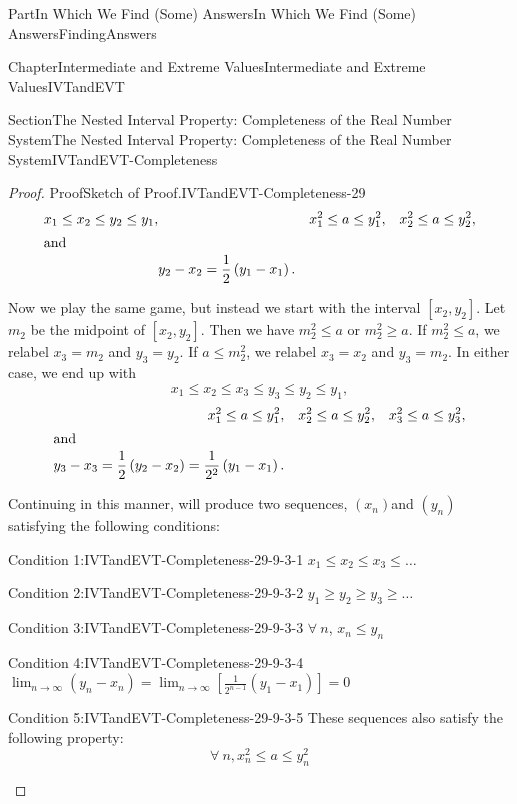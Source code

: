 \documentclass[oneside,10pt,]{book}
\numberwithin{equation}{part}
\def\limit#1#2#3{{\displaystyle\lim_{#1\rightarrow #2}#3}}
\newcommand{\amp}{&}
\begin{document}
\begin{partptx}{Part}{In Which We Find (Some) Answers}{}{In Which We Find (Some) Answers}{}{}{FindingAnswers}
\begin{chapterptx}{Chapter}{Intermediate and Extreme Values}{}{Intermediate and Extreme Values}{}{}{IVTandEVT}
\begin{sectionptx}{Section}{The Nested Interval Property: Completeness of the Real Number System}{}{The Nested Interval Property: Completeness of the Real Number System}{}{}{IVTandEVT-Completeness}
\begin{proof}{Proof}{Sketch of Proof.}{IVTandEVT-Completeness-29}
\begin{align*}
x_1\leq x_2\leq y_2\leq y_1,
\amp{}            \amp{}
x_1^2\leq a\leq y_1^2,
\amp{}\amp{}
x_2^2\leq a\leq y_2^2,\\
\intertext{and}
\amp{}
y_2-x_2=\frac{1}{2}\left(y_1-x_1\right).
\end{align*}
%
\par
Now we play the same game, but instead we start with the interval \([x_2,y_2]\).  Let \(m_2\) be the midpoint of \([x_2,y_2]\).  Then we have \(m_2^2\leq a\) or \(m_2^2\geq a\).  If \(m_2^2\leq a\), we relabel \(x_3=m_2\) and \(y_3=y_2\).  If \(a\leq m_2^2\), we relabel \(x_3=x_2\) and \(y_3=m_2\).  In either case, we end up with%
\begin{equation*}
x_1\leq x_2\leq x_3\leq y_3\leq y_2\leq y_1,
\end{equation*}
%
\begin{align*}
x_1^2\leq a\leq y_1^2,
\amp{}\amp{}
x_2^2\leq a\leq y_2^2,
\amp{}\amp{}
x_3^2\leq a\leq y_3^2,\\
\intertext{and}
y_3-x_3=\frac{1}{2}\left(y_2-x_2\right)=\frac{1}{2^2}\left(y_1-x_1\right).
\end{align*}
%
\par
Continuing in this manner, will produce two sequences, \(\left(x_n\right)\)and \(\left(y_n\right)\) satisfying the following conditions:%
\begin{descriptionlist}
\begin{dlimedium}{Condition 1:}{IVTandEVT-Completeness-29-9-3-1}%
\(\displaystyle x_1\leq x_2\leq x_3\leq\ldots\)%
\end{dlimedium}%
\begin{dlimedium}{Condition 2:}{IVTandEVT-Completeness-29-9-3-2}%
\(\displaystyle y_1\geq y_2\geq y_3\geq\ldots\)%
\end{dlimedium}%
\begin{dlimedium}{Condition 3:}{IVTandEVT-Completeness-29-9-3-3}%
\(\forall\ n\), \(x_n\leq y_n\)%
\end{dlimedium}%
\begin{dlimedium}{Condition 4:}{IVTandEVT-Completeness-29-9-3-4}%
\(\displaystyle \limit{n}{\infty}{\left(y_n-x_n\right)}=\limit{n}{\infty}{\left[\frac{1}{2^{n-1}}\left(y_1-x_1\right)\right]}=0\)%
\end{dlimedium}%
\begin{dlimedium}{Condition 5:}{IVTandEVT-Completeness-29-9-3-5}%
These sequences also satisfy the following property:%
\begin{equation*}
\forall\  n, x_n^2\leq a\leq y_n^2
\end{equation*}

\end{dlimedium}
\end{descriptionlist}
\end{proof}
\end{sectionptx}
\end{chapterptx}
\end{partptx}
\end{document}
